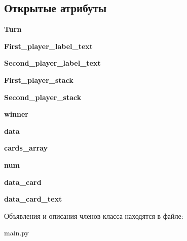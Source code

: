 \subsection*{Открытые атрибуты}
\begin{DoxyCompactItemize}
\item 
\mbox{\label{classmain_1_1_play___window_addda02907958a97f0fc9d0243858b286}} 
{\bfseries Turn}
\item 
\mbox{\label{classmain_1_1_play___window_a2f848043f7388152c6340a6665cdcaea}} 
{\bfseries First\+\_\+player\+\_\+label\+\_\+text}
\item 
\mbox{\label{classmain_1_1_play___window_ad188f8db4593aaaeb5aec03229314a55}} 
{\bfseries Second\+\_\+player\+\_\+label\+\_\+text}
\item 
\mbox{\label{classmain_1_1_play___window_aa4864362d632a424cbf2e5f6b811ad74}} 
{\bfseries First\+\_\+player\+\_\+stack}
\item 
\mbox{\label{classmain_1_1_play___window_a4c9ed64e88d33c53857a063b0e222f63}} 
{\bfseries Second\+\_\+player\+\_\+stack}
\item 
\mbox{\label{classmain_1_1_play___window_a8f7a691e9e97b6d6f7bbf963f0bfa2cc}} 
{\bfseries winner}
\item 
\mbox{\label{classmain_1_1_play___window_aa057557e59c6257ec3115e9c2696f955}} 
{\bfseries data}
\item 
\mbox{\label{classmain_1_1_play___window_a7f12a12e4a5e053191e7b5988e53c532}} 
{\bfseries cards\+\_\+array}
\item 
\mbox{\label{classmain_1_1_play___window_a0362dcc3c10a3127709efc5a6d34a0ca}} 
{\bfseries num}
\item 
\mbox{\label{classmain_1_1_play___window_a2ea7f2e7ea96a958357d39b6307cae3b}} 
{\bfseries data\+\_\+card}
\item 
\mbox{\label{classmain_1_1_play___window_ad45b4e2c3342494e7e8875a2cd5664a7}} 
{\bfseries data\+\_\+card\+\_\+text}
\end{DoxyCompactItemize}


Объявления и описания членов класса находятся в файле\+:\begin{DoxyCompactItemize}
\item 
main.\+py\end{DoxyCompactItemize}
